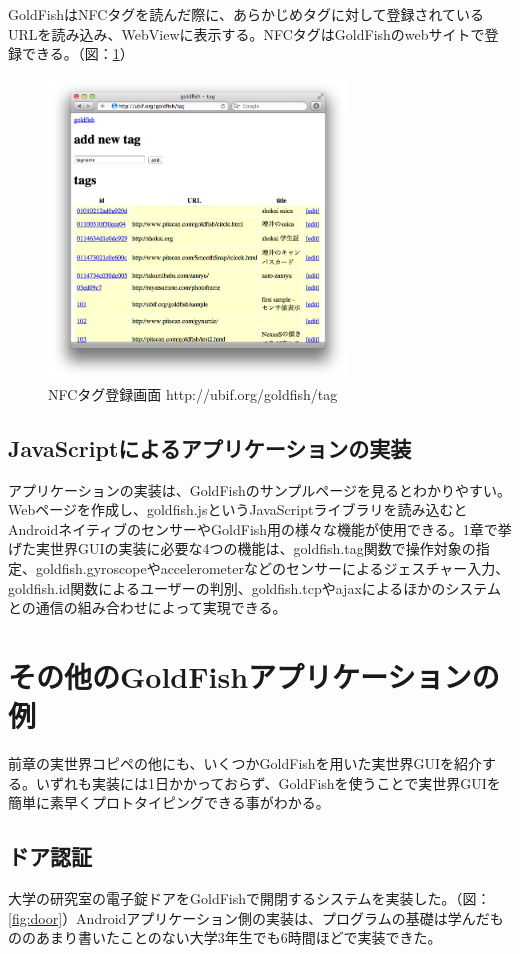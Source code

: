 GoldFishはNFCタグを読んだ際に、あらかじめタグに対して登録されているURLを読み込み、WebViewに表示する。NFCタグはGoldFishのwebサイトで登録できる。（図：\ref{fig:tags}）
\begin{figure}
  \begin{center}
    \includegraphics[height=80mm]{img/tags.png}
  \end{center}
  \caption{NFCタグ登録画面 http://ubif.org/goldfish/tag}
  \label{fig:tags}
\end{figure}

\subsection{JavaScriptによるアプリケーションの実装}
アプリケーションの実装は、GoldFishのサンプルページ\cite{sample}を見るとわかりやすい。Webページを作成し、goldfish.jsというJavaScriptライブラリを読み込むとAndroidネイティブのセンサーやGoldFish用の様々な機能が使用できる。1章で挙げた実世界GUIの実装に必要な4つの機能は、goldfish.tag関数で操作対象の指定、goldfish.gyroscopeやaccelerometerなどのセンサーによるジェスチャー入力、goldfish.id関数によるユーザーの判別、goldfish.tcpやajaxによるほかのシステムとの通信の組み合わせによって実現できる。


\section{その他のGoldFishアプリケーションの例}
前章の実世界コピペの他にも、いくつかGoldFishを用いた実世界GUIを紹介する。いずれも実装には1日かかっておらず、GoldFishを使うことで実世界GUIを簡単に素早くプロトタイピングできる事がわかる。

\subsection{ドア認証}
大学の研究室の電子錠ドアをGoldFishで開閉するシステムを実装した。（図：\ref{fig:door}）Androidアプリケーション側の実装は、プログラムの基礎は学んだもののあまり書いたことのない大学3年生でも6時間ほどで実装できた。

